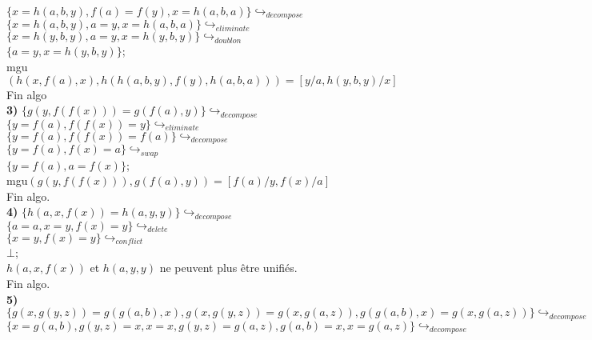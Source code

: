 \documentclass{article}
\begin{document}
$\{x=h(a,b,y), f(a)=f(y), x=h(a,b,a)\} \hookrightarrow_{decompose}$\\

$\{x=h(a,b,y), a=y, x=h(a,b,a)\} \hookrightarrow_{eliminate}$\\

$\{x=h(y,b,y), a=y, x=h(y,b,y)\} \hookrightarrow_{doublon}$\\

$\{a=y, x=h(y,b,y)\}$;\\

mgu$(h(x,f(a),x),h(h(a,b,y),f(y),h(a,b,a))) = [y/a,h(y,b,y)/x]$\\
Fin algo \\

\textbf{3)} $\{g(y,f(f(x))) = g(f(a),y)\} \hookrightarrow_{decompose}$\\

$\{y=f(a),f(f(x))=y\} \hookrightarrow_{eliminate}$\\

$\{y=f(a),f(f(x))=f(a)\} \hookrightarrow_{decompose}$\\

$\{y=f(a),f(x)=a\} \hookrightarrow_{swap}$\\

$\{y=f(a),a=f(x)\}$;\\

mgu$(g(y,f(f(x))),g(f(a),y)) = [f(a)/y,f(x)/a]$\\
Fin algo. \\

\textbf{4)} $\{h(a,x,f(x)) = h(a,y,y)\} \hookrightarrow_{decompose}$\\

$\{a=a,x=y,f(x)=y\} \hookrightarrow_{delete}$\\

$\{x=y,f(x)=y\} \hookrightarrow_{conflict}$\\
$\bot$;\\

$h(a,x,f(x))$ et $h(a,y,y)$ ne peuvent plus être unifiés.\\
Fin algo. \\

\textbf{5)} 
$\{g(x,g(y,z)) = g(g(a,b),x), g(x,g(y,z)) = g(x,g(a,z)), g(g(a,b),x) = g(x,g(a,z))\} \hookrightarrow_{decompose}$\\

$\{x=g(a,b), g(y,z)=x, x=x, g(y,z)=g(a,z), g(a,b)=x, x=g(a,z)\} \hookrightarrow_{decompose}$\\
\end{document}
